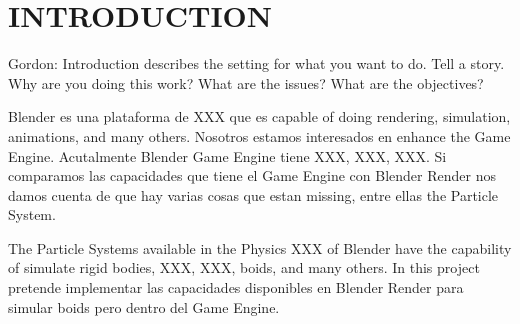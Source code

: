 \chapter{INTRODUCTION}

Gordon: Introduction describes the setting for what you want to do. Tell a story. Why are you doing this work? What are the issues? What are the objectives?

Blender es una plataforma de XXX 	que es capable of doing rendering, simulation, animations, and many others. Nosotros estamos interesados en enhance the Game Engine. Acutalmente Blender Game Engine tiene XXX, XXX, XXX.  Si comparamos las capacidades que tiene el Game Engine con Blender Render nos damos cuenta de que hay varias cosas que estan missing, entre ellas the Particle System.

The Particle Systems available in the Physics XXX of Blender have the capability of simulate rigid bodies, XXX, XXX, boids, and many others. In this project pretende implementar las capacidades disponibles en Blender Render para simular boids pero dentro del Game Engine.



